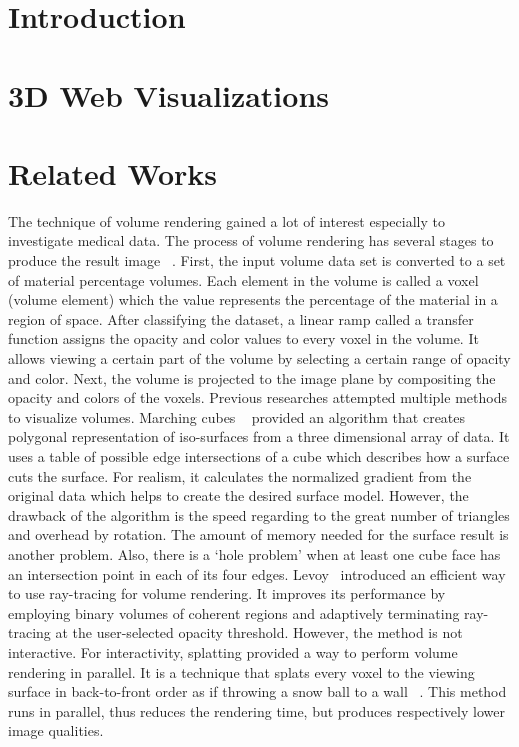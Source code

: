 \documentclass{acm_proc_article-sp}
\begin{document}
\maketitle
\begin{abstract}
\end{abstract}


\section{Introduction}


\section{3D Web Visualizations}

\section{Related Works}
The technique of volume rendering gained a lot of interest especially to investigate medical data. The process of volume rendering has several stages to produce the result image ~\cite{drebin:1988}. First, the input volume data set is converted to a set of material percentage volumes. Each element in the volume is called a voxel (volume element) which the value represents the percentage of the material in a region of space. After classifying the dataset, a linear ramp called a transfer function assigns the opacity and color values to every voxel in the volume. It allows viewing a certain part of the volume by selecting a certain range of opacity and color. Next, the volume is projected to the image plane by compositing the opacity and colors of the voxels. 
Previous researches attempted multiple methods to visualize volumes. Marching cubes ~\cite{lorensen:1987} provided an algorithm that creates polygonal representation of iso-surfaces from a three dimensional array of data. It uses a table of possible edge intersections of a cube which describes how a surface cuts the surface. For realism, it calculates the normalized gradient from the original data which helps to create the desired surface model. However, the drawback of the algorithm is the speed regarding to the great number of triangles and overhead by rotation. The amount of memory needed for the surface result is another problem. Also, there is a ‘hole problem’ when at least one cube face has an intersection point in each of its four edges.
Levoy~\cite{levoy:1990} introduced an efficient way to use ray-tracing for volume rendering. It improves its performance by employing binary volumes of coherent regions and adaptively terminating ray-tracing at the user-selected opacity threshold. However, the method is not interactive.
For interactivity, splatting provided a way to perform volume rendering in parallel. It is a technique that splats every voxel to the viewing surface in back-to-front order as if throwing a snow ball to a wall ~\cite{westover:1991}. This method runs in parallel, thus reduces the rendering time, but produces respectively lower image qualities. 
\end{document}
